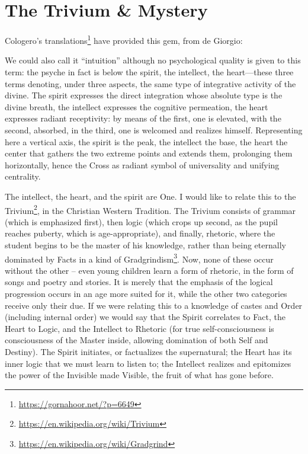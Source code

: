 \section{The Trivium \& Mystery}


Cologero's translations\footnote{\url{https://gornahoor.net/?p=6649}} have provided this gem, from de Giorgio:

\begin{quotex}
We could also call it ``intuition'' although no psychological quality is given to this term: the psyche in fact is below the spirit, the intellect, the heart---these three terms denoting, under three aspects, the same type of integrative activity of the divine. The spirit expresses the direct integration whose absolute type is the divine breath, the intellect expresses the cognitive permeation, the heart expresses radiant receptivity: by means of the first, one is elevated, with the second, absorbed, in the third, one is welcomed and realizes himself. Representing here a vertical axis, the spirit is the peak, the intellect the base, the heart the center that gathers the two extreme points and extends them, prolonging them horizontally, hence the Cross as radiant symbol of universality and unifying centrality.
\end{quotex}


The intellect, the heart, and the spirit are One. I would like to relate this to the Trivium\footnote{\url{https://en.wikipedia.org/wiki/Trivium}}, in the Christian Western Tradition. The Trivium consists of grammar (which is emphasized first), then logic (which crops up second, as the pupil reaches puberty, which is age-appropriate), and finally, rhetoric, where the student begins to be the master of his knowledge, rather than being eternally dominated by Facts in a kind of Gradgrindism\footnote{\url{https://en.wikipedia.org/wiki/Gradgrind}}. Now, none of these occur without the other -- even young children learn a form of rhetoric, in the form of songs and poetry and stories. It is merely that the emphasis of the logical progression occurs in an age more suited for it, while the other two categories receive only their due. If we were relating this to a knowledge of castes and Order (including internal order) we would say that the Spirit correlates to Fact, the Heart to Logic, and the Intellect to Rhetoric (for true self-consciousness is consciousness of the Master inside, allowing domination of both Self and Destiny). The Spirit initiates, or factualizes the supernatural; the Heart has its inner logic that we must learn to listen to; the Intellect realizes and epitomizes the power of the Invisible made Visible, the fruit of what has gone before.

